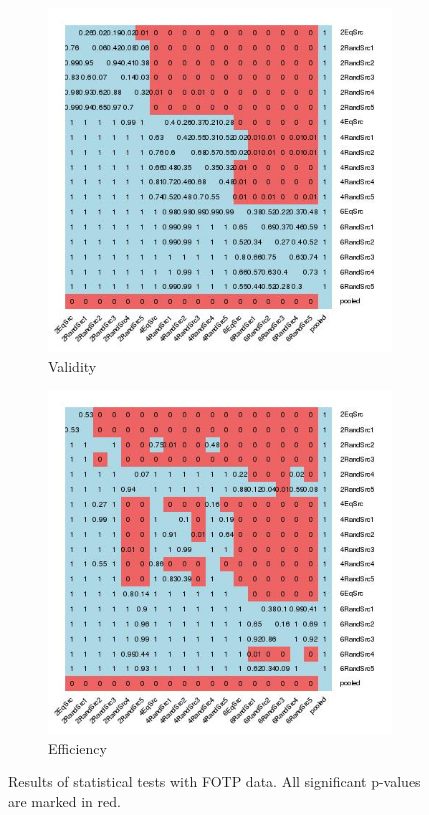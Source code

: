 \documentclass[main]{subfiles}
\begin{document}
\begin{figure}[!h]
\centering
\begin{subfigure}{.5\textwidth}
  \centering
  \includegraphics[width=\linewidth]{images/heatmapFotp}
  \caption{Validity}
  \label{fig:valFotp}
\end{subfigure}%
\begin{subfigure}{.5\textwidth}
  \centering
  \includegraphics[width=\linewidth]{images/heatmapFotp_eff}
  \caption{Efficiency}
  \label{fig:effFotp}
\end{subfigure}%
\caption{Results of statistical tests with FOTP data. All significant p-values are marked in red.} \label{fig:testFotp}
\end{figure}
\end{document}
